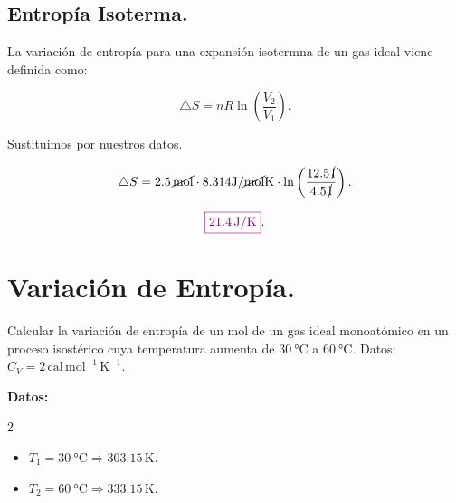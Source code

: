 \documentclass[a4paper,12pt]{article} %
\begin{document}
\subsection{Entropía Isoterma.}

\begin{justify}
    La variación de entropía para una expansión isotermna de un gas ideal viene definida como:
\end{justify}

\[ \triangle S = nR \ln \left(\frac{V_2}{V_1}\right). \]

\begin{justify}
    Sustituimos por nuestros datos.
\end{justify}

\[ \triangle S = 2.5 \, \cancel{\mathrm{mol}} \cdot 8.314 \mathrm{J}/\cancel{\mathrm{mol}} \mathrm{K} \cdot \ln \left(\frac{12.5 \, \cancel{\mathrm{l}}}{4.5 \, \cancel{\mathrm{l}}}\right). \]

\vspace{\baselineskip}

\[\textcolor{violet}{\boxed{21.4 \, \mathrm{J}/\mathrm{K}}}.\]

\vspace{\baselineskip}

\section{Variación de Entropía.}

\begin{justify}
    Calcular la variación de entropía de un mol de un gas ideal monoatómico en un proceso isostérico cuya temperatura aumenta de \( \SI{30}{\degreeCelsius} \) a \( \SI{60}{\degreeCelsius} \). Datos: \( C_V = 2 \, \mathrm{cal} \, \mathrm{ mol^{-1}} \, \mathrm{K^{-1}}\).
\end{justify}

\begin{justify}
    \textbf{Datos:}
\end{justify}

\begin{multicols}{2}
    \begin{itemize}
        \item \( T_1 = \SI{30}{\degreeCelsius} \Rightarrow 303.15 \, \mathrm{K}. \)
        \item \( T_2 = \SI{60}{\degreeCelsius} \Rightarrow 333.15 \, \mathrm{K}. \)
    \end{itemize}
\end{multicols}
\end{document}

